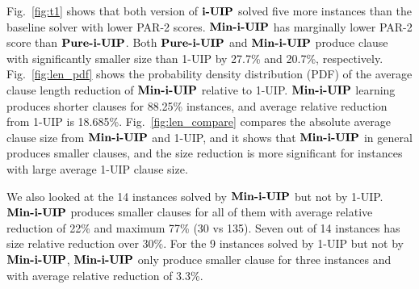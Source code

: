Fig.~\ref{fig:t1} shows that both version of $\textbf{i-UIP}$ solved five more instances than the baseline solver with lower PAR-2 scores. $\textbf{Min-i-UIP}$ has marginally lower PAR-2 score than $\textbf{Pure-i-UIP}$. Both $\textbf{Pure-i-UIP}$ and $\textbf{Min-i-UIP}$ produce clause with significantly smaller size than 1-UIP by 27.7\% and 20.7\%, respectively. Fig.~\ref{fig:len_pdf} shows the probability density distribution (PDF) of the average clause length reduction of $\textbf{Min-i-UIP}$ relative to 1-UIP. $\textbf{Min-i-UIP}$ learning produces shorter clauses for 88.25\% instances, and average relative reduction from 1-UIP is 18.685\%. Fig.~\ref{fig:len_compare} compares the absolute average clause size from $\textbf{Min-i-UIP}$ and 1-UIP, and it shows that $\textbf{Min-i-UIP}$ in general produces smaller clauses, and the size reduction is more significant for instances with large average 1-UIP clause size. 

We also looked at the 14 instances solved by $\textbf{Min-i-UIP}$ but not by 1-UIP. $\textbf{Min-i-UIP}$ produces smaller clauses for all of them with average relative reduction of 22\% and maximum 77\% (30 vs 135). Seven out of 14 instances has size relative reduction over 30\%. For the 9 instances solved by 1-UIP but not by $\textbf{Min-i-UIP}$, $\textbf{Min-i-UIP}$ only produce smaller clause for three instances and with average relative reduction of 3.3\%.



